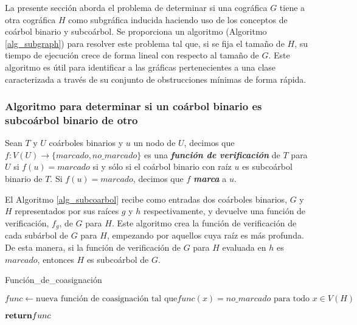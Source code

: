 La presente sección aborda el problema de determinar si una cográfica $G$ tiene
a otra cográfica $H$ como subgráfica inducida haciendo uso de los conceptos de
coárbol binario y subcoárbol. Se proporciona un algoritmo (Algoritmo
\ref{alg_subgraph}) para resolver este problema tal que, si se fija el tamaño de
$H$, su tiempo de ejecución crece de forma lineal con respecto al tamaño de $G$.
Este algoritmo es útil para identificar a las gráficas pertenecientes a una clase
caracterizada a través de su conjunto de obstrucciones mínimas de forma rápida.

\subsubsection{Algoritmo para determinar si un coárbol binario es subcoárbol binario de otro}

Sean $T$ y $U$ coárboles binarios y $u$ un nodo de $U$, decimos que
$f \colon V(U)\rightarrow\{marcado, no\_marcado\}$ es una
\textbf{\emph{función de verificación}} de $T$ para $U$ si $f(u) = marcado$
si y sólo si el coárbol binario con raíz $u$ es subcoárbol binario de
$T$. Si $f(u) = marcado$, decimos que $f$ \textbf{\emph{marca}} a $u$.

El Algoritmo \ref{alg_subcoarbol} recibe como entradas dos coárboles binarios,
$G$ y $H$ representados por sus raíces $g$ y $h$ respectivamente, y devuelve
una función de verificación, $f_g$, de $G$ para $H$. Este algoritmo crea la
función de verificación de cada subárbol de $G$ para $H$, empezando por
aquellos cuya raíz es más profunda. De esta manera, si la función de
verificación de $G$ para $H$ evaluada en $h$ es $marcado$, entonces $H$ es
subcoárbol de $G$.

\begin{algorithm}[ht!]
\caption{Función\_de\_coasignación}
\label{alg_subcoarbol}
\DontPrintSemicolon %

 $func \gets \text{nueva función de coasignación tal que} func(x)=no\_marcado \text{ para todo } x\in V(H)$\;


$\Return func$

\end{algorithm}

